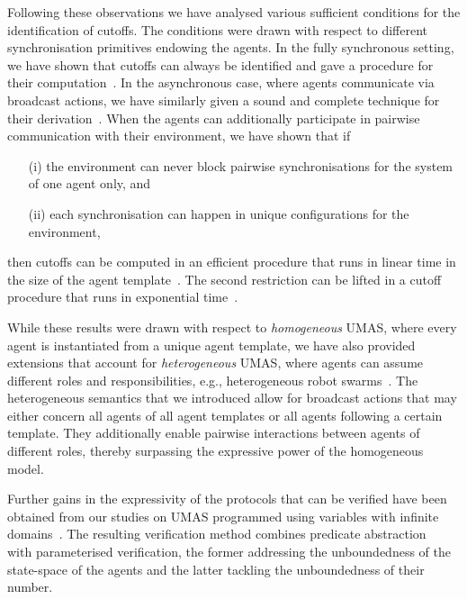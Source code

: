 \documentclass{article}
\begin{document}
Following these observations we have analysed various sufficient conditions for
the identification of cutoffs. The conditions were drawn with respect to
different  synchronisation primitives endowing the agents.  In the fully
synchronous setting, we have shown that cutoffs can always be identified and
gave a procedure for their computation~\cite{KouvarosLomuscio15b}.  In the
asynchronous case, where agents communicate via broadcast actions, we have
similarly given a sound and complete technique for their
derivation~\cite{KouvarosLomuscio13a}. When the agents
can additionally participate in pairwise communication with their environment,
we have shown that if 
\begin{itemize} \item[(i)] the environment can never block
pairwise synchronisations for the system of one agent only, and \item[(ii)] each
synchronisation can happen in unique configurations for the environment,
\end{itemize} then  cutoffs can be computed in an efficient procedure that runs
in linear time in the size of the agent template~\cite{KouvarosLomuscio13b}. The
second restriction can be lifted in a cutoff procedure that runs in exponential
time~\cite{KouvarosLomuscio15}. 

While these results were drawn with respect to {\em homogeneous} UMAS, where every
agent is instantiated from a unique agent template, we have also provided
extensions that account for {\em heterogeneous} UMAS, where agents can assume
different roles and responsibilities, e.g., heterogeneous robot
swarms~\cite{KouvarosLomuscio16a}. The heterogeneous semantics that we introduced allow for
broadcast actions that may either concern all agents of all agent templates or
all agents following a certain template. They additionally enable pairwise
interactions between agents of different roles, thereby surpassing the
expressive power of the homogeneous model.

Further gains in the expressivity of the protocols that can be verified have been
obtained from our studies on UMAS programmed using variables with infinite
domains~\cite{KouvarosLomuscio17a}. The resulting verification method  combines
predicate abstraction~\cite{LomuscioMichaliszyn15} with parameterised
verification, the former addressing the unboundedness of the state-space of the
agents and the latter tackling the unboundedness of their number.  



\end{document}
